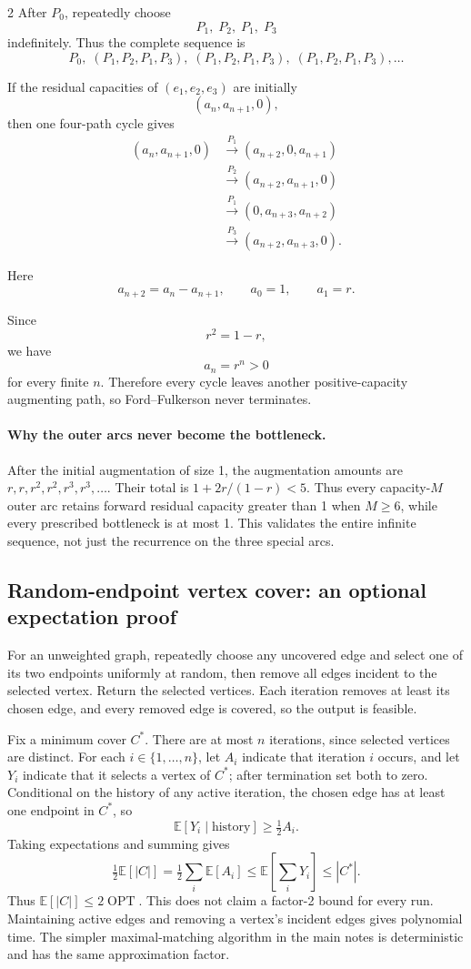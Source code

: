 \documentclass[10pt]{article}
\theoremstyle{definition}
\newcommand{\OPT}{\operatorname{OPT}}
\begin{document}
\begin{multicols*}{2}
After $P_0$, repeatedly choose
\[
\boxed{
P_1,\;P_2,\;P_1,\;P_3
}
\]
indefinitely. Thus the complete sequence is
\[
\boxed{
P_0,\;
(P_1,P_2,P_1,P_3),\;
(P_1,P_2,P_1,P_3),\;
(P_1,P_2,P_1,P_3),\ldots
}
\]

If the residual capacities of $(e_1,e_2,e_3)$ are initially
\[
(a_n,a_{n+1},0),
\]
then one four-path cycle gives
\begin{align*}
(a_n,a_{n+1},0)
&\xrightarrow{P_1}
(a_{n+2},0,a_{n+1})\\
&\xrightarrow{P_2}
(a_{n+2},a_{n+1},0)\\
&\xrightarrow{P_1}
(0,a_{n+3},a_{n+2})\\
&\xrightarrow{P_3}
(a_{n+2},a_{n+3},0).
\end{align*}

Here
\[
a_{n+2}=a_n-a_{n+1},
\qquad
a_0=1,
\qquad
a_1=r.
\]

Since
\[
r^2=1-r,
\]
we have
\[
a_n=r^n>0
\]
for every finite $n$. Therefore every cycle leaves another
positive-capacity augmenting path, so Ford--Fulkerson never terminates.




\paragraph{Why the outer arcs never become the bottleneck.}
After the initial augmentation of size 1, the augmentation amounts are
$r,r,r^2,r^2,r^3,r^3,\ldots$. Their total is
$1+2r/(1-r)<5$. Thus every capacity-$M$ outer arc retains forward residual capacity
greater than 1 when $M\ge6$, while every prescribed bottleneck is at most 1.
This validates the entire infinite sequence, not just the recurrence on the three special arcs.


\subsection{Random-endpoint vertex cover: an optional expectation proof}
\label{app:randomvc}
For an unweighted graph, repeatedly choose any uncovered edge and select one of its two
endpoints uniformly at random, then remove all edges incident to the selected vertex.
Return the selected vertices. Each iteration removes at least its chosen edge, and every
removed edge is covered, so the output is feasible.

Fix a minimum cover $C^*$. There are at most $n$ iterations, since selected vertices are
distinct. For each $i\in\{1,\ldots,n\}$, let $A_i$ indicate that iteration $i$ occurs,
and let $Y_i$ indicate that it selects a vertex of $C^*$; after termination set both to zero.
Conditional on the history of any active iteration, the chosen edge has at least one
endpoint in $C^*$, so
\[
\mathbb E[Y_i\mid\text{history}]\ge\tfrac12 A_i.
\]
Taking expectations and summing gives
\[
\tfrac12\mathbb E[|C|]=\tfrac12\sum_i\mathbb E[A_i]
\le\mathbb E\!\left[\sum_iY_i\right]\le |C^*|.
\]
Thus $\mathbb E[|C|]\le2\OPT$. This does not claim a factor-2 bound for every run.
Maintaining active edges and removing a vertex's incident edges gives polynomial time.
The simpler maximal-matching algorithm in the main notes is deterministic and has the
same approximation factor.

\end{multicols*}
\end{document}
